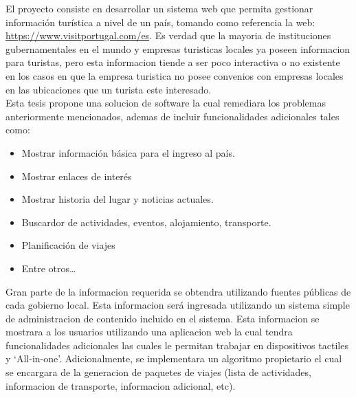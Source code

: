 \documentclass{article}
\begin{document}
El proyecto consiste en desarrollar un sistema web que permita gestionar
información turística a nivel de un país, tomando como referencia la web:
\url{https://www.visitportugal.com/es}. Es verdad que la mayoria de instituciones
gubernamentales en el mundo y empresas turisticas locales ya poseen informacion
para turistas, pero esta informacion tiende a ser poco interactiva o no existente
en los casos en que la empresa turistica no posee convenios con empresas locales
en las ubicaciones que un turista este interesado.\\
Esta tesis propone una solucion de software la cual remediara los problemas
anteriormente mencionados, ademas de incluir funcionalidades adicionales tales como:
\begin{itemize}
    \item{Mostrar información básica para el ingreso al país.}
    \item{Mostrar enlaces de interés}
    \item{Mostrar historia del lugar y noticias actuales.}
    \item{Buscardor de actividades, eventos, alojamiento, transporte.}
    \item{Planificación de viajes}
    \item{Entre otros\ldots{}}
\end{itemize}
Gran parte de la informacion requerida se obtendra utilizando fuentes públicas
de cada gobierno local. Esta informacion será ingresada utilizando un sistema
simple de administracion de contenido incluido en el sistema. Esta informacion
se mostrara a los usuarios utilizando una aplicacion web la cual tendra funcionalidades
adicionales las cuales le permitan trabajar en dispositivos tactiles y `All-in-one'.
Adicionalmente, se implementara un algoritmo propietario el cual se encargara
de la generacion de paquetes de viajes (lista de actividades, informacion de transporte,
informacion adicional, etc).
\end{document}
